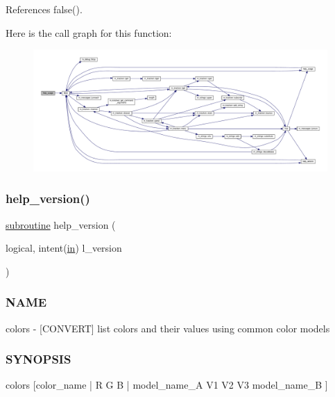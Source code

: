 References false().

Here is the call graph for this function\+:
\nopagebreak
\begin{figure}[H]
\begin{center}
\leavevmode
\includegraphics[width=350pt]{colors_8f90_a3e09a3b52ee8fb04eeb93fe5761626a8_cgraph}
\end{center}
\end{figure}
\mbox{\label{colors_8f90_a39c21619b08a3c22f19e2306efd7f766}} 
\subsubsection{\texorpdfstring{help\+\_\+version()}{help\_version()}}
{\footnotesize\ttfamily \hyperlink{M__stopwatch_83_8txt_acfbcff50169d691ff02d4a123ed70482}{subroutine} help\+\_\+version (\begin{DoxyParamCaption}\item[{logical, intent(\hyperlink{M__journal_83_8txt_afce72651d1eed785a2132bee863b2f38}{in})}]{l\+\_\+version }\end{DoxyParamCaption})}



\subsubsection*{N\+A\+ME}

colors -\/ \mbox{[}C\+O\+N\+V\+E\+RT\mbox{]} list colors and their values using common color models 

\subsubsection*{S\+Y\+N\+O\+P\+S\+IS}

\begin{DoxyVerb}colors [color_name | R G B | model_name_A V1 V2 V3 model_name_B ]
\end{DoxyVerb}


